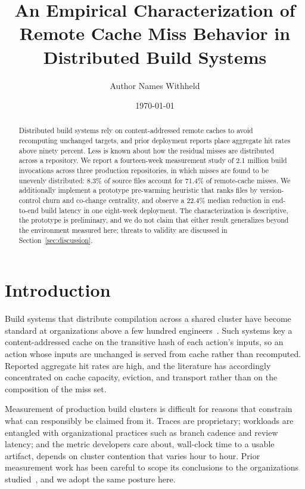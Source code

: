 \documentclass{anvil-paper}
\title{An Empirical Characterization of Remote Cache Miss Behavior in Distributed Build Systems}
\author{Author Names Withheld}
\date{\today}
\begin{document}
\maketitle

\begin{abstract}
Distributed build systems rely on content-addressed remote caches to avoid
recomputing unchanged targets, and prior deployment reports place aggregate
hit rates above ninety percent. Less is known about how the residual misses
are distributed across a repository. We report a fourteen-week measurement
study of 2.1 million build invocations across three production repositories,
in which misses are found to be unevenly distributed: 8.3\% of source files
account for 71.4\% of remote-cache misses. We additionally implement a
prototype pre-warming heuristic that ranks files by version-control churn and
co-change centrality, and observe a 22.4\% median reduction in end-to-end
build latency in one eight-week deployment. The characterization is
descriptive, the prototype is preliminary, and we do not claim that either
result generalizes beyond the environment measured here; threats to validity
are discussed in Section~\ref{sec:discussion}.
\end{abstract}

\section{Introduction}
\label{sec:intro}

Build systems that distribute compilation across a shared cluster have become
standard at organizations above a few hundred engineers~\cite{okonkwo2019remote}.
Such systems key a content-addressed cache on the transitive hash of each
action's inputs, so an action whose inputs are unchanged is served from cache
rather than recomputed. Reported aggregate hit rates are high, and the
literature has accordingly concentrated on cache capacity, eviction, and
transport rather than on the composition of the miss set.

Measurement of production build clusters is difficult for reasons that
constrain what can responsibly be claimed from it. Traces are proprietary;
workloads are entangled with organizational practices such as branch cadence
and review latency; and the metric developers care about, wall-clock time to a
usable artifact, depends on cluster contention that varies hour to hour. Prior
measurement work has been careful to scope its conclusions to the
organizations studied~\cite{vargas2018buildlatency}, and we adopt the same
posture here.
\end{document}
